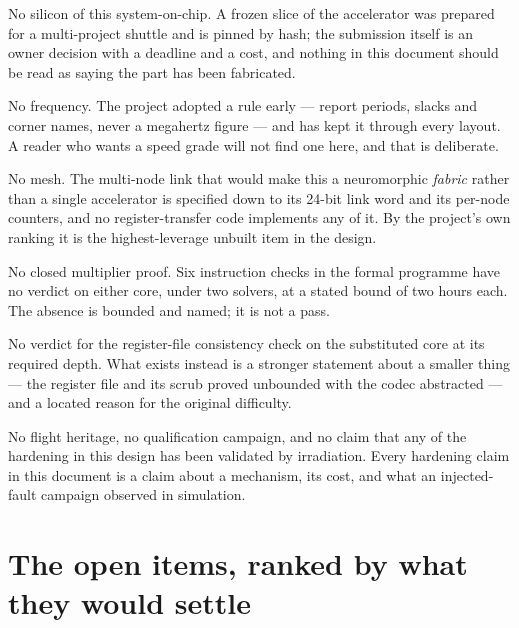 No silicon of this system-on-chip. A frozen slice of the accelerator
was prepared for a multi-project shuttle and is pinned by hash; the
submission itself is an owner decision with a deadline and a cost, and
nothing in this document should be read as saying the part has been
fabricated.

No frequency. The project adopted a rule early --- report periods,
slacks and corner names, never a megahertz figure --- and has kept it
through every layout. A reader who wants a speed grade will not find
one here, and that is deliberate.

No mesh. The multi-node link that would make this a neuromorphic
\emph{fabric} rather than a single accelerator is specified down to its
24-bit link word and its per-node counters, and no register-transfer
code implements any of it. By the project's own ranking it is the
highest-leverage unbuilt item in the design.

No closed multiplier proof. Six instruction checks in the formal
programme have no verdict on either core, under two solvers, at a
stated bound of two hours each. The absence is bounded and named; it is
not a pass.

No verdict for the register-file consistency check on the substituted
core at its required depth. What exists instead is a stronger statement
about a smaller thing --- the register file and its scrub proved
unbounded with the codec abstracted --- and a located reason for the
original difficulty.

No flight heritage, no qualification campaign, and no claim that any of
the hardening in this design has been validated by irradiation. Every
hardening claim in this document is a claim about a mechanism, its
cost, and what an injected-fault campaign observed in simulation.

\section{The open items, ranked by what they would settle}

